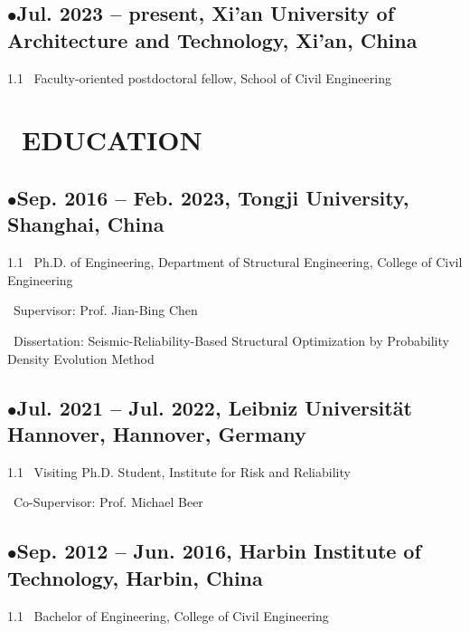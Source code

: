 \documentclass{resume}
\begin{document}
\subsection{$\bullet$\;\;\textbf{Jul. 2023 -- present, Xi'an University of Architecture and Technology, Xi'an, China}}
\begin{spacing}{1.1}
 \quad\  Faculty-oriented postdoctoral fellow, School of Civil Engineering \par
\end{spacing}

\section{\faGraduationCap\  EDUCATION}
\subsection{$\bullet$\;\;\textbf{Sep. 2016 -- Feb. 2023, Tongji University, Shanghai, China}}
\begin{spacing}{1.1}
\quad\ Ph.D. of Engineering, Department of Structural Engineering, College of Civil Engineering \par
\quad\ Supervisor: Prof. Jian-Bing Chen \par
\quad\ Dissertation: Seismic-Reliability-Based Structural Optimization by Probability Density Evolution Method
\end{spacing}
\subsection{$\bullet$\;\;\textbf{Jul. 2021 -- Jul. 2022, Leibniz Universität Hannover, Hannover, Germany}}
\begin{spacing}{1.1}
 \quad\ Visiting Ph.D. Student, Institute for Risk and Reliability \par
\quad\ Co-Supervisor: Prof. Michael Beer\
\end{spacing}
\subsection{$\bullet$\;\;\textbf{Sep. 2012 -- Jun. 2016, Harbin Institute of Technology, Harbin, China}}
\begin{spacing}{1.1}
  \quad\ Bachelor of Engineering, College of Civil Engineering
\end{spacing}
\end{document}
